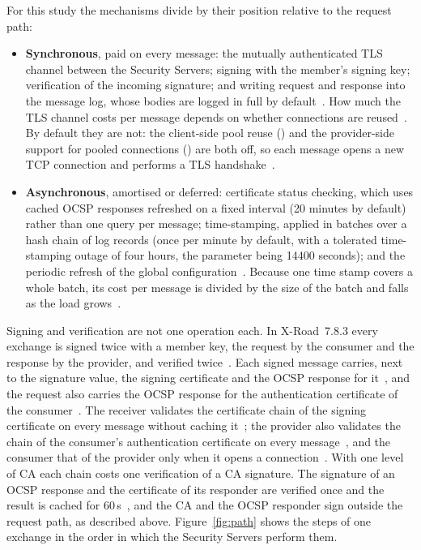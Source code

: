 \documentclass[conference,a4paper]{IEEEtran}
\newcommand{\newtext}[1]{{\color{blue}#1}}
\begin{document}
For this study the mechanisms divide by their position relative to the request path:

\begin{itemize}
  \item \textbf{Synchronous}, paid on every message: the mutually authenticated TLS channel between
  the Security Servers; signing with the member's signing key; verification of the incoming
  signature; and writing request and response into the message log, whose bodies are logged in full
  by default~\cite{xroadsyspar}. How much the TLS channel costs per message depends on whether
  connections are reused~\cite{naylor2014}. By default they are not: the client-side pool reuse
  () and the provider-side support for pooled connections
  () are both off, so each message opens a new
  TCP connection and performs a TLS handshake~\cite{xroadsyspar}.
  \item \textbf{Asynchronous}, amortised or deferred: certificate status checking, which uses cached
  OCSP responses refreshed on a fixed interval (20 minutes by default) rather than one query per
  message; time-stamping, applied in batches over a hash chain of log records (once per minute by
  default, with a tolerated time-stamping outage of four hours, the parameter
   being 14400 seconds); and the periodic refresh of the
  global configuration~\cite{kivimaki2020,xroadsyspar,ansper2013}. Because one time stamp covers a
  whole batch, its cost per message is divided by the size of the batch and falls as the load
  grows~\cite{xroadarcss,ansper2013}.
\end{itemize}

\newtext{Signing and verification are not one operation each. In X-Road~7.8.3 every exchange is
signed twice with a member key, the request by the consumer and the response by the provider, and
verified twice\newtext{~\cite{xroadmesstransp}}. Each signed message carries, next to the signature value, the signing certificate
and the OCSP response for it\newtext{~\cite[\texttt{SignatureVerifier}]{xroadsrc}}, and the request also carries the OCSP response for the authentication
certificate of the consumer\newtext{~\cite{xroadmesstransp}}. The receiver validates the certificate chain of the signing certificate
on every message without caching it\newtext{~\cite[\texttt{CertChainVerifier}]{xroadsrc}}; the provider also validates the chain of the consumer's
authentication certificate on every message\newtext{~\cite[\texttt{ServerMessageProcessor}]{xroadsrc}}, and the consumer that of the provider only when it
opens a connection\newtext{~\cite{xroadmesstransp}}. With one level of CA each chain costs one verification of a CA signature. The
signature of an OCSP response and the certificate of its responder are verified once and the result
is cached for 60\,s\newtext{~\cite[\texttt{OcspVerifier}]{xroadsrc}}, and the CA and the OCSP responder sign outside the request path\newtext{, as
described above}.}
\newtext{Figure~\ref{fig:path} shows the steps of one exchange in the order in which the Security
Servers perform them.}
\end{document}
